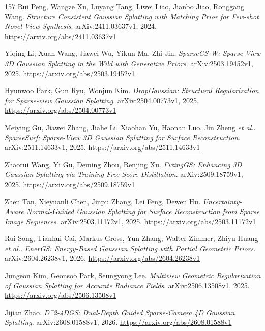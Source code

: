 \documentclass[11pt,a4paper]{article}
\begin{document}
\begin{thebibliography}{157}
Rui Peng, Wangze Xu, Luyang Tang, Liwei Liao, Jianbo Jiao, Ronggang Wang.
\newblock \emph{Structure Consistent Gaussian Splatting with Matching Prior for Few-shot Novel View Synthesis}.
\newblock arXiv:2411.03637v1, 2024.
\newblock \url{https://arxiv.org/abs/2411.03637v1}

Yiqing Li, Xuan Wang, Jiawei Wu, Yikun Ma, Zhi Jin.
\newblock \emph{SparseGS-W: Sparse-View 3D Gaussian Splatting in the Wild with Generative Priors}.
\newblock arXiv:2503.19452v1, 2025.
\newblock \url{https://arxiv.org/abs/2503.19452v1}

Hyunwoo Park, Gun Ryu, Wonjun Kim.
\newblock \emph{DropGaussian: Structural Regularization for Sparse-view Gaussian Splatting}.
\newblock arXiv:2504.00773v1, 2025.
\newblock \url{https://arxiv.org/abs/2504.00773v1}

Meiying Gu, Jiawei Zhang, Jiahe Li, Xiaohan Yu, Haonan Luo, Jin Zheng \emph{et al.}.
\newblock \emph{SparseSurf: Sparse-View 3D Gaussian Splatting for Surface Reconstruction}.
\newblock arXiv:2511.14633v1, 2025.
\newblock \url{https://arxiv.org/abs/2511.14633v1}

Zhaorui Wang, Yi Gu, Deming Zhou, Renjing Xu.
\newblock \emph{FixingGS: Enhancing 3D Gaussian Splatting via Training-Free Score Distillation}.
\newblock arXiv:2509.18759v1, 2025.
\newblock \url{https://arxiv.org/abs/2509.18759v1}

Zhen Tan, Xieyuanli Chen, Jinpu Zhang, Lei Feng, Dewen Hu.
\newblock \emph{Uncertainty-Aware Normal-Guided Gaussian Splatting for Surface Reconstruction from Sparse Image Sequences}.
\newblock arXiv:2503.11172v1, 2025.
\newblock \url{https://arxiv.org/abs/2503.11172v1}

Rui Song, Tianhui Cai, Markus Gross, Yun Zhang, Walter Zimmer, Zhiyu Huang \emph{et al.}.
\newblock \emph{EnerGS: Energy-Based Gaussian Splatting with Partial Geometric Priors}.
\newblock arXiv:2604.26238v1, 2026.
\newblock \url{https://arxiv.org/abs/2604.26238v1}

Jungeon Kim, Geonsoo Park, Seungyong Lee.
\newblock \emph{Multiview Geometric Regularization of Gaussian Splatting for Accurate Radiance Fields}.
\newblock arXiv:2506.13508v1, 2025.
\newblock \url{https://arxiv.org/abs/2506.13508v1}

Jijian Zhao.
\newblock \emph{D\textasciicircum{}2-4DGS: Dual-Depth Guided Sparse-Camera 4D Gaussian Splatting}.
\newblock arXiv:2608.01588v1, 2026.
\newblock \url{https://arxiv.org/abs/2608.01588v1}


\end{thebibliography}
\end{document}

